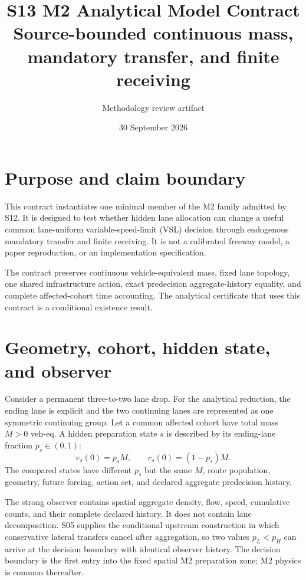 \documentclass[11pt]{article}
\title{S13 M2 Analytical Model Contract\\\large Source-bounded continuous mass, mandatory transfer, and finite receiving}
\author{Methodology review artifact}
\date{30 September 2026}
\newcommand{\ve}{\text{veh-eq}}
\begin{document}
\maketitle

\section{Purpose and claim boundary}

This contract instantiates one minimal member of the M2 family admitted by S12.
It is designed to test whether hidden lane allocation can change a useful common
lane-uniform variable-speed-limit (VSL) decision through endogenous mandatory
transfer and finite receiving. It is not a calibrated freeway model, a paper
reproduction, or an implementation specification.

The contract preserves continuous vehicle-equivalent mass, fixed lane topology,
one shared infrastructure action, exact predecision aggregate-history equality,
and complete affected-cohort time accounting. The analytical certificate that
uses this contract is a conditional existence result.

\section{Geometry, cohort, hidden state, and observer}

Consider a permanent three-to-two lane drop. For the analytical reduction, the
ending lane is explicit and the two continuing lanes are represented as one
symmetric continuing group. Let a common affected cohort have total mass
\(M>0\) \(\ve\). A hidden preparation state \(s\) is described by its
ending-lane fraction \(p_s\in(0,1)\):
\begin{equation}
 e_s(0)=p_sM,\qquad c_s(0)=(1-p_s)M.
 \label{eq:init}
\end{equation}
The compared states have different \(p_s\) but the same \(M\), route
population, geometry, future forcing, action set, and declared aggregate
predecision history.

The strong observer contains spatial aggregate density, flow, speed, cumulative
counts, and their complete declared history. It does not contain lane
decomposition. S05 supplies the conditional upstream construction in which
conservative lateral transfers cancel after aggregation, so two values
\(p_L<p_H\) can arrive at the decision boundary with identical observer history.
The decision boundary is the first entry into the fixed spatial M2 preparation
zone; M2 physics is common thereafter.
\end{document}
